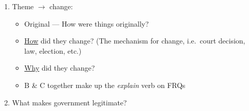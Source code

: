 \documentclass[12pt]{article}
\begin{document}
\begin{enumerate}
\begin{itemize}
    \end{itemize}

  \item Theme $\longrightarrow$ change:

    \begin{itemize}

      \item Original — How were things originally?

      \item \underline{How} did they change? (The mechanism for change, i.e.\ court decision, law, election, etc.)

      \item \underline{Why} did they change?

      \item B \& C together make up the \textit{explain} verb on FRQs

    \end{itemize}

  \item What makes government legitimate?

\end{enumerate}
\end{document}
